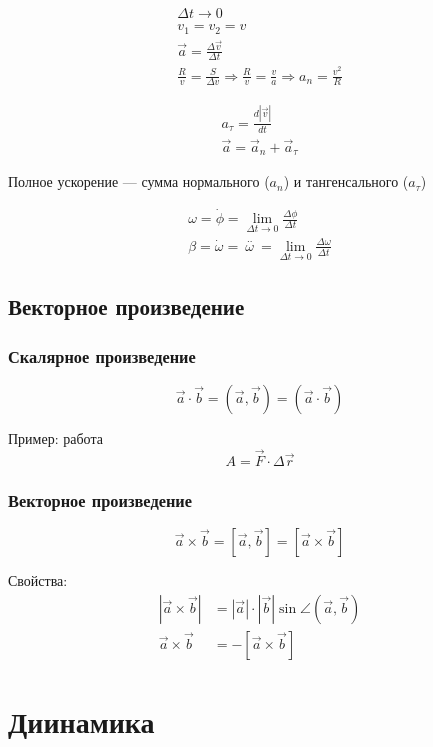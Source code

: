 \documentclass{article}
\begin{document}
\begin{gather*}
	\Delta t \to 0 \\
	v_1 = v_2 = v \\
	\vec{a} = \frac{\Delta \vec{v}}{\Delta t} \\
	\frac{R}{v} = \frac{S}{\Delta v} \Rightarrow \frac{R}{v} = \frac{v}{a} \Rightarrow a_n = \frac{v^2}{R}
\end{gather*}

\begin{gather*}
	a_\tau = \frac{d|\vec{v}|}{dt} \\
	\vec{a} = \vec{a}_n + \vec{a}_\tau
\end{gather*}

Полное ускорение --- сумма нормального ($a_n$) и тангенсального ($a_\tau$)

\begin{gather*}
	\omega = \dot{\phi} = \lim_{\Delta t \to 0} \frac{\Delta \phi}{\Delta t} \\
	\beta = \dot{\omega} =\ \stackrel{..}{\omega}\ = \lim_{\Delta t \to 0} \frac{\Delta \omega}{\Delta t}
\end{gather*}

\subsection{Векторное произведение}

\subsubsection*{Скалярное произведение}
\[ \vec{a} \cdot \vec{b} = (\vec{a}, \vec{b}) = (\vec{a} \cdot \vec{b}) \]

Пример: работа
\[ A = \vec{F} \cdot \Delta \vec{r} \]

\subsubsection*{Векторное произведение}
\[ \vec{a} \times \vec{b} = [\vec{a}, \vec{b}] = [\vec{a} \times \vec{b}] \]

Свойства:
\begin{align*}
	|\vec{a} \times \vec{b}| &= |\vec{a}| \cdot |\vec{b}| \sin \angle(\vec{a}, \vec{b}) \\
	\vec{a} \times \vec{b} &= -[\vec{a} \times \vec{b}]
\end{align*}

\pagebreak
\section{Диинамика}
\end{document}
